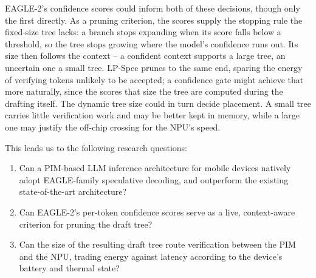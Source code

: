 \documentclass[11pt]{article}
\begin{document}
EAGLE-2's confidence scores could inform both of these decisions, though only the first directly. As a pruning criterion, the scores supply the stopping rule the fixed-size tree lacks: a branch stops expanding when its score falls below a threshold, so the tree stops growing where the model's confidence runs out. Its size then follows the context -- a confident context supports a large tree, an uncertain one a small tree. LP-Spec prunes to the same end, sparing the energy of verifying tokens unlikely to be accepted; a confidence gate might achieve that more naturally, since the scores that size the tree are computed during the drafting itself. The dynamic tree size could in turn decide placement. A small tree carries little verification work and may be better kept in memory, while a large one may justify the off-chip crossing for the NPU's speed.

This leads us to the following research questions:
\begin{enumerate}
    \item Can a PIM-based LLM inference architecture for mobile devices natively adopt EAGLE-family speculative decoding, and outperform the existing state-of-the-art architecture?
    \item Can EAGLE-2's per-token confidence scores serve as a live, context-aware criterion for pruning the draft tree?
    \item Can the size of the resulting draft tree route verification between the PIM and the NPU, trading energy against latency according to the device's battery and thermal state?
\end{enumerate}
\end{document}
